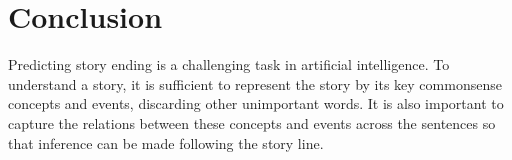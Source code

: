 \section{Conclusion}
Predicting story ending is a challenging task in artificial intelligence.
To understand a story, it is sufficient to represent the story by its key
commonsense concepts and events, discarding other unimportant words. 
It is also important to capture the relations between these concepts and
events across the sentences so that inference can be made following
the story line. 
